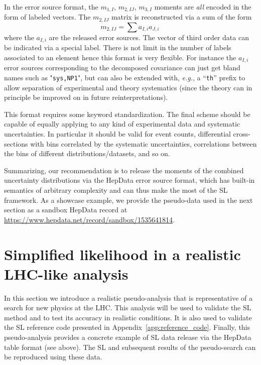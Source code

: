 \documentclass[11pt]{article}
\def\eg{{\it e.g.}}
\newcommand{\be}{\begin{equation}}
\newcommand{\ee}{\end{equation}}
\begin{document}
In the error source format, the $m_{1,I}$, $m_{2,IJ}$, $m_{3,I}$ moments are
\textit{all} encoded in the form of labeled vectors. The $m_{2,IJ}$ matrix is
reconstructed via a sum of the form \be m_{2,IJ}= \sum {a_{I,i}a_{J,i}} \, 
\label{eq:sum_errsource}
\ee
where the $a_{I,i}$ are the released error sources.
The vector of third order data can be  indicated via a special label.
There is not limit in the number of labels associated to an element hence this format is very flexible.
For instance the $a_{I,i}$ error sources corresponding to the decomposed covariance  can just get bland names such as "{\tt sys,NP1}", but  can also be extended with, \eg, a ``{\tt th}'' prefix to allow separation of experimental and theory systematics (since the theory can in principle be improved on in future reinterpretations).


This format requires some keyword standardization.  The final scheme should
be capable of equally applying to any kind of experimental data and systematic uncertainties. In particular it should be valid for event counts,  differential cross-sections with bins correlated by the systematic uncertainties, correlations between  the bins of different distributions/datasets, and so on.


Summarizing, our recommendation is to release the moments of the combined uncertainty distributions via the HepData error source format, which has built-in semantics of arbitrary complexity and can thus make the most of the SL framework. As a showcase example, we provide the pseudo-data used in the next section as a sandbox HepData record at \url{https://www.hepdata.net/record/sandbox/1535641814}.








\section{Simplified likelihood in a  realistic LHC-like analysis }
\label{se:SL_LHC}

In this section we introduce a realistic pseudo-analysis that is representative of a search for new physics at the LHC. 
This analysis will be used to validate the SL method and to test its accuracy in realistic conditions. 
It is also used to validate the SL reference code presented in Appendix~\ref{app:reference_code}. 
Finally, this pseudo-analysis provides a concrete example of SL data release via the HepData table format (see above). 
The SL and subsequent results of the pseudo-search can be reproduced using these data. 
\end{document}
